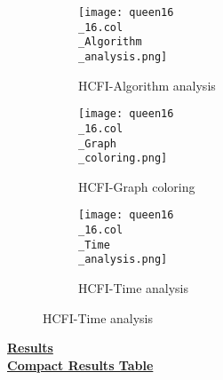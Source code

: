 \documentclass[10pt]{article}
\begin{document}
\graphicspath{{./Core1/Solutions/HCFI/queen16\_16.col}}
\begin{figure}[H]
\begin{subfigure}{.33\textwidth}
  \centering
  \texttt{[image: queen16\\\_16.col\\\_Algorithm\\\_analysis.png]}
  \caption{HCFI-Algorithm analysis}
   \label{fig:subfig1}
\end{subfigure}%
\begin{subfigure}{.33\textwidth}
  \centering
  \texttt{[image: queen16\\\_16.col\\\_Graph\\\_coloring.png]}
  \caption{HCFI-Graph coloring}
  \label{fig:subfig2}
\end{subfigure}
\begin{subfigure}{.33\textwidth}
  \centering
  \texttt{[image: queen16\\\_16.col\\\_Time\\\_analysis.png]}
  \caption{HCFI-Time analysis}
  \end{subfigure}
\end{figure}
\vspace{2cm}
\begin{center}
\hyperlink{page.8}{\textbf{Results}}\\
\vspace{0.5cm}
\hyperlink{page.71}{\textbf{Compact Results Table}}
\end{center}
\pagebreak
\end{document}
